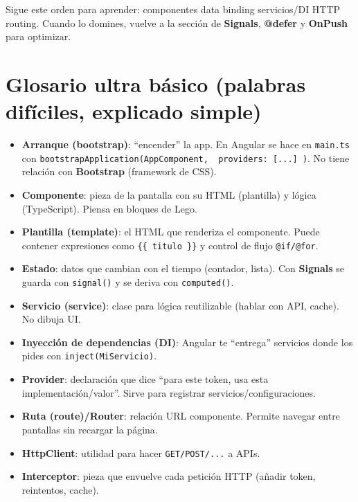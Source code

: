 \documentclass[11pt,a4paper]{article}
\begin{document}
\begin{tipbox}
Sigue este orden para aprender: componentes \textrightarrow{} data binding \textrightarrow{} servicios/DI \textrightarrow{} HTTP \textrightarrow{} routing. Cuando lo domines, vuelve a la sección de \textbf{Signals}, \textbf{@defer} y \textbf{OnPush} para optimizar.
\end{tipbox}


\section{Glosario ultra básico (palabras difíciles, explicado simple)}
\begin{itemize}[leftmargin=*]
  \item \textbf{Arranque (bootstrap)}: “encender” la app. En Angular se hace en \texttt{main.ts} con \texttt{bootstrapApplication(AppComponent, { providers: [...] })}. No tiene relación con \textbf{Bootstrap} (framework de CSS).
  \item \textbf{Componente}: pieza de la pantalla con su HTML (plantilla) y lógica (TypeScript). Piensa en bloques de Lego.
  \item \textbf{Plantilla (template)}: el HTML que renderiza el componente. Puede contener expresiones como \texttt{{\{\{ titulo \}\}}} y control de flujo \texttt{@if/@for}.
  \item \textbf{Estado}: datos que cambian con el tiempo (contador, lista). Con \textbf{Signals} se guarda con \texttt{signal()} y se deriva con \texttt{computed()}.
  \item \textbf{Servicio (service)}: clase para lógica reutilizable (hablar con API, cache). No dibuja UI.
  \item \textbf{Inyección de dependencias (DI)}: Angular te “entrega” servicios donde los pides con \texttt{inject(MiServicio)}.
  \item \textbf{Provider}: declaración que dice “para este token, usa esta implementación/valor”. Sirve para registrar servicios/configuraciones.
  \item \textbf{Ruta (route)/Router}: relación URL \textrightarrow{} componente. Permite navegar entre pantallas sin recargar la página.
  \item \textbf{HttpClient}: utilidad para hacer \texttt{GET/POST/...} a APIs.
  \item \textbf{Interceptor}: pieza que envuelve cada petición HTTP (añadir token, reintentos, cache).

\end{itemize}
\end{document}
